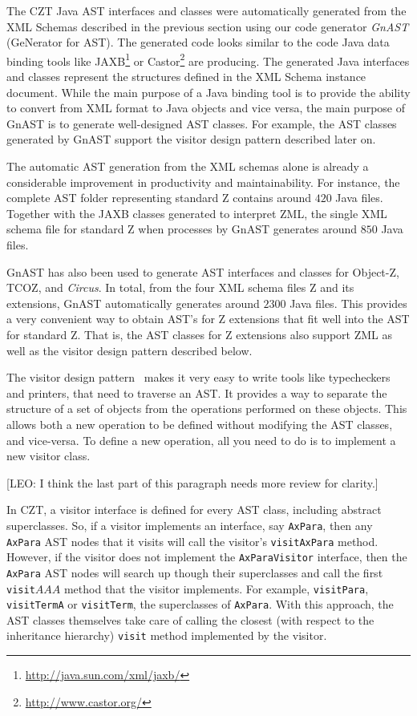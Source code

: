 \documentclass{llncs}
\newcommand{\Circus}{{\sf\slshape Circus}}
\newcommand{\Interface}[1]{\texttt{#1}}
\newcommand{\Method}[1]{\texttt{#1}}
\begin{document}
  The CZT Java AST interfaces and classes were automatically generated
  from the XML Schemas described in the previous section using our
  code generator \emph{GnAST} (GeNerator for AST).  The generated code
  looks similar to the code Java data binding tools like
  JAXB\footnote{\url{http://java.sun.com/xml/jaxb/}} or
  Castor\footnote{\url{http://www.castor.org/}} are producing.  The
  generated Java interfaces and classes represent the structures
  defined in the XML Schema instance document.  While the main purpose
  of a Java binding tool is to provide the ability to convert from XML
  format to Java objects and vice versa, the main purpose of GnAST is
  to generate well-designed AST classes.  For example, the AST classes
  generated by GnAST support the visitor design pattern described
  later on.

  The automatic AST generation from the XML schemas alone is already
  a considerable improvement in productivity and maintainability.
  For instance, the complete AST folder representing standard Z
  contains around $420$ Java files.
  Together with the JAXB classes generated to interpret ZML,
  the single XML schema file for standard Z when processes by GnAST
  generates around $850$ Java files.

  GnAST has also been used to generate AST interfaces and classes for
  Object-Z, TCOZ, and \Circus.
  In total, from the four XML schema files Z and its extensions,
  GnAST automatically generates around $2300$ Java files.
  This provides a very convenient way to obtain AST's for Z extensions that fit well into the AST for
  standard Z.  That is, the AST classes for Z extensions also support
  ZML as well as the visitor design pattern described below.

  The visitor design pattern~\cite{GamEA:95,MaiCha:01} makes it very
  easy to write tools like typecheckers and printers, that need to
  traverse an AST. It provides a way to separate the structure of a
  set of objects from the operations performed on these objects.  This
  allows both a new operation to be defined without modifying the AST
  classes, and vice-versa.  To define a new operation, all you need to do is
  to implement a new visitor class.

  [LEO: I think the last part of this paragraph needs more review for clarity.]

  In CZT, a visitor interface is defined for every AST class,
  including abstract superclasses.  So, if a visitor implements an
  interface, say \Interface{AxPara}, then any \Interface{AxPara} AST
  nodes that it visits will call the visitor's \Method{visitAxPara}
  method.  However, if the visitor does not implement the
  \Interface{AxParaVisitor} interface, then the \Interface{AxPara} AST
  nodes will search up though their superclasses and call the first
  \Method{visit$AAA$} method that the visitor implements. For example,
  \Interface{visitPara}, \Interface{visitTermA} or \Interface{visitTerm},
  the superclasses of \Interface{AxPara}.
  With this approach, the AST classes themselves take care of calling
  the closest (with respect to the inheritance hierarchy)
  \Method{visit} method implemented by the visitor.
\end{document}
